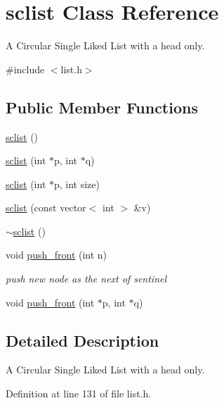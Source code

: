 \hypertarget{classsclist}{\section{sclist Class Reference}
\label{classsclist}
}


A Circular Single Liked List with a head only.  




{\ttfamily \#include $<$list.\-h$>$}

\subsection*{Public Member Functions}
\begin{DoxyCompactItemize}
\item 
\hyperlink{classsclist_a22b47cdd2bea697d6e0b708a6fb904af}{sclist} ()
\item 
\hyperlink{classsclist_a82af11a92c4626a894dd98afbf4802cc}{sclist} (int $\ast$p, int $\ast$q)
\item 
\hyperlink{classsclist_aa3b32b45eb2d489f61a94002a720e5a7}{sclist} (int $\ast$p, int size)
\item 
\hyperlink{classsclist_a616510a8f7c9a6330e3f667e9fc35dcb}{sclist} (const vector$<$ int $>$ \&v)
\item 
\hyperlink{classsclist_a5eeb44634f2b0fbed000c1e303463881}{$\sim$sclist} ()
\item 
void \hyperlink{classsclist_ab18718668a0c9278922c1c173112aaee}{push\-\_\-front} (int n)
\begin{DoxyCompactList}\small\item\em push new node as the next of sentinel \end{DoxyCompactList}\item 
void \hyperlink{classsclist_a5646584dd15b375711c85343b88de3bf}{push\-\_\-front} (int $\ast$p, int $\ast$q)
\end{DoxyCompactItemize}


\subsection{Detailed Description}
A Circular Single Liked List with a head only. 

Definition at line 131 of file list.\-h.



